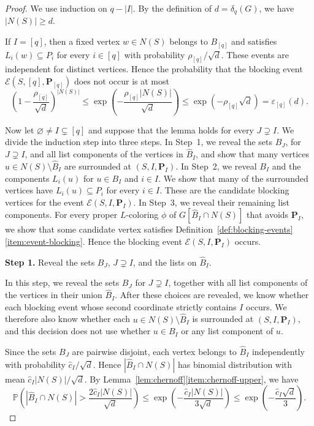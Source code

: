 \documentclass[12pt]{article}
\numberwithin{equation}{section}
\theoremstyle{definition}
\newcommand{\Prob}{\mathbb{P}}
\begin{document}
\begin{proof}
We use induction on $q - |I|$. By the definition of $d = \delta_q(G)$, we have
$|N(S)| \geq d$.

If $I = [q]$, then a fixed vertex $w \in N(S)$ belongs to $B_{[q]}$ and
satisfies $L_i(w) \subseteq P_i$ for every $i \in [q]$ with probability
$\rho_{[q]}/\sqrt d$. These events are independent for distinct vertices.
Hence the probability that the blocking event
$\mathcal{E}(S,[q],\mathbf{P}_{[q]})$ does not occur is at most
\[
 \left(1 - \frac{\rho_{[q]}}{\sqrt d}\right)^{|N(S)|}
 \leq \exp\left(-\frac{\rho_{[q]}|N(S)|}{\sqrt d}\right)
 \leq \exp(-\rho_{[q]}\sqrt{d})
 = \varepsilon_{[q]}(d).
\]

Now let $\varnothing \ne I \subsetneq [q]$ and suppose that the lemma holds
for every $J \supsetneq I$.
We divide the induction step into three steps. In Step~1, we reveal the sets
$B_J$, for $J \supsetneq I$, and all list components of the vertices in
$\hat{B}_{I}$, and show that many vertices
$u \in N(S) \setminus \hat{B}_{I}$ are surrounded at $(S,I,\mathbf{P}_I)$. In
Step~2, we reveal $B_I$ and the components $L_i(u)$ for $u\in B_I$ and
$i\in I$. We show that many of the surrounded vertices have
$L_i(u) \subseteq P_i$ for every $i \in I$. These are the candidate blocking vertices
for the event
$\mathcal{E}(S,I,\mathbf{P}_I)$. In Step~3, we reveal their remaining list
components. For every proper $L$-coloring $\phi$ of
$G[\hat{B}_{I} \cap N(S)]$ that avoids $\mathbf{P}_I$, we show that some
candidate vertex satisfies Definition~\ref{def:blocking-events}%
\ref{item:event-blocking}. Hence the blocking event
$\mathcal{E}(S,I,\mathbf{P}_I)$ occurs.

\medskip
\noindent
\textbf{Step 1.} Reveal the sets $B_J$, $J \supsetneq I$, and the lists on
$\hat{B}_{I}$.\par\nobreak
\medskip

In this step, we reveal the sets $B_J$ for $J \supsetneq I$,
together with all list components of the vertices in their union
$\hat{B}_{I}$. After these choices are revealed, we know whether each blocking
event whose second coordinate strictly contains $I$ occurs. We therefore also
know whether each $u \in N(S) \setminus \hat{B}_{I}$ is surrounded at
$(S,I,\mathbf{P}_I)$, and this decision does not use whether $u \in B_I$ or any
list component of $u$.

Since the sets $B_J$ are pairwise disjoint, each vertex belongs to
$\hat{B}_{I}$ independently with probability $\hat{c}_{I}/\sqrt{d}$.
Hence $|\hat{B}_{I} \cap N(S)|$ has binomial distribution with mean
$\hat{c}_{I}|N(S)|/\sqrt{d}$.
By Lemma~\ref{lem:chernoff}\ref{item:chernoff-upper}, we have
\begin{equation}\label{eq:upper-tail}
 \Prob\left(
 |\hat{B}_{I} \cap N(S)| > \frac{2\hat{c}_{I}|N(S)|}{\sqrt{d}}
 \right)
 \leq \exp\left(-\frac{\hat{c}_{I}|N(S)|}{3\sqrt{d}}\right)
 \leq \exp\left(-\frac{\hat{c}_{I}\sqrt{d}}{3}\right).
\end{equation}


\end{proof}
\end{document}
